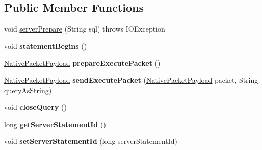 \subsection*{Public Member Functions}
\begin{DoxyCompactItemize}
\item 
void \mbox{\hyperlink{classcom_1_1mysql_1_1cj_1_1_server_prepared_query_abfccd6509abf393d67f2ba609867edea}{server\+Prepare}} (String sql)  throws I\+O\+Exception 
\item 
\mbox{\label{classcom_1_1mysql_1_1cj_1_1_server_prepared_query_a1979165e4817f532f32a5d0d8c9b1a49}} 
void {\bfseries statement\+Begins} ()
\item 
\mbox{\label{classcom_1_1mysql_1_1cj_1_1_server_prepared_query_a9e77b4c8e2491489910402fa885729fb}} 
\mbox{\hyperlink{classcom_1_1mysql_1_1cj_1_1protocol_1_1a_1_1_native_packet_payload}{Native\+Packet\+Payload}} {\bfseries prepare\+Execute\+Packet} ()
\item 
\mbox{\label{classcom_1_1mysql_1_1cj_1_1_server_prepared_query_a8f5a41f09734ecd15eee6a12c5530716}} 
\mbox{\hyperlink{classcom_1_1mysql_1_1cj_1_1protocol_1_1a_1_1_native_packet_payload}{Native\+Packet\+Payload}} {\bfseries send\+Execute\+Packet} (\mbox{\hyperlink{classcom_1_1mysql_1_1cj_1_1protocol_1_1a_1_1_native_packet_payload}{Native\+Packet\+Payload}} packet, String query\+As\+String)
\item 
\mbox{\label{classcom_1_1mysql_1_1cj_1_1_server_prepared_query_a4f5928a31d2a6f738cf93f06984c22e4}} 
void {\bfseries close\+Query} ()
\item 
\mbox{\label{classcom_1_1mysql_1_1cj_1_1_server_prepared_query_a36c52212a9bc785f9911ca76628ce0e9}} 
long {\bfseries get\+Server\+Statement\+Id} ()
\item 
\mbox{\label{classcom_1_1mysql_1_1cj_1_1_server_prepared_query_a556ac6267fb6859db7c39af4240ba51b}} 
void {\bfseries set\+Server\+Statement\+Id} (long server\+Statement\+Id)
\item 

\end{DoxyCompactItemize}

